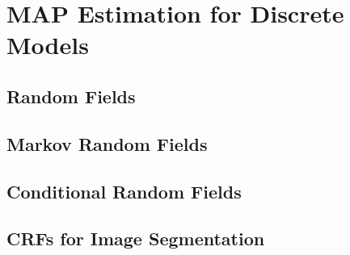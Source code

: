 
\section{MAP Estimation for Discrete Models}
\label{sec:MAPEstimates}


\subsection{Random Fields}
\label{sec:RandomFields}


\subsection{Markov Random Fields}
\label{sec:MarkovRandomFields}


\subsection{Conditional Random Fields}
\label{sec:ConditionalRandomFields}


\subsection{CRFs for Image Segmentation}
\label{sec:ConditionalRandomFieldsForImageSegmentation}


